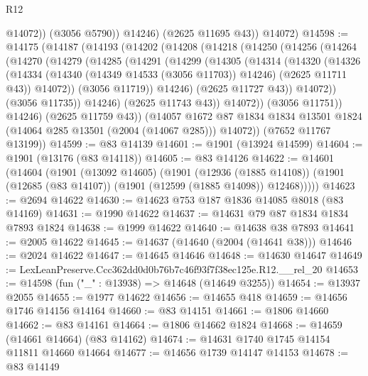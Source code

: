 \begin{lexlean}{R12}
\begin{coremodule}
                @14072))
            (@3056 @5790))
          @14246)
        (@2625 @11695 @43))
      @14072)
@14598 := @14175
    (@14187
      (@14193
        (@14202
          (@14208
            (@14218
              (@14250
                (@14256
                  (@14264
                    (@14270
                      (@14279
                        (@14285
                          (@14291
                            (@14299
                              (@14305
                                (@14314
                                  (@14320
                                    (@14326
                                      (@14334
                                        (@14340 (@14349 @14533 (@3056 @11703)) @14246)
                                        (@2625 @11711 @43))
                                      @14072))
                                  (@3056 @11719))
                                @14246)
                              (@2625 @11727 @43))
                            @14072))
                        (@3056 @11735))
                      @14246)
                    (@2625 @11743 @43))
                  @14072))
              (@3056 @11751))
            @14246)
          (@2625 @11759 @43))
        (@14057
          @1672
          @87
          @1834
          @1834
          @13501
          @1824
          (@14064 @285 @13501 (@2004 (@14067 @285)))
          @14072))
      (@7652 @11767 @13199))
@14599 := @83 @14139
@14601 := @1901 (@13924 @14599)
@14604 := @1901 (@13176 (@83 @14118))
@14605 := @83 @14126
@14622 := @14601
    (@14604
      (@1901
        (@13092 @14605)
        (@1901
          (@12936 (@1885 @14108))
          (@1901 (@12685 (@83 @14107)) (@1901 (@12599 (@1885 @14098)) @12468)))))
@14623 := @2694 @14622
@14630 := @14623 @753 @187 @1836 @14085 @8018 (@83 @14169)
@14631 := @1990 @14622
@14637 := @14631 @79 @87 @1834 @1834 @7893 @1824
@14638 := @1999 @14622
@14640 := @14638 @38 @7893
@14641 := @2005 @14622
@14645 := @14637 (@14640 (@2004 (@14641 @38)))
@14646 := @2024 @14622
@14647 := @14645 @14646
@14648 := @14630 @14647
@14649 := LexLeanPreserve.Ccc362dd0d0b76b7c46f93f7f38ec125e.R12.__rel_20
@14653 := @14598 (fun ("_" : @13938) => @14648 (@14649 @3255))
@14654 := @13937 @2055
@14655 := @1977 @14622
@14656 := @14655 @418
@14659 := @14656 @1746 @14156 @14164
@14660 := @83 @14151
@14661 := @1806 @14660
@14662 := @83 @14161
@14664 := @1806 @14662 @1824
@14668 := @14659 (@14661 @14664) (@83 @14162)
@14674 := @14631 @1740 @1745 @14154 @11811 @14660 @14664
@14677 := @14656 @1739 @14147 @14153
@14678 := @83 @14149

\end{coremodule}
\end{lexlean}
